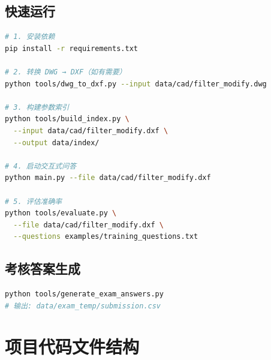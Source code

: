 \documentclass[11pt,a4paper]{article}
\begin{document}
\subsection{快速运行}

\begin{lstlisting}[frame=single,language=bash]
# 1. 安装依赖
pip install -r requirements.txt

# 2. 转换 DWG → DXF（如有需要）
python tools/dwg_to_dxf.py --input data/cad/filter_modify.dwg

# 3. 构建参数索引
python tools/build_index.py \
  --input data/cad/filter_modify.dxf \
  --output data/index/

# 4. 启动交互式问答
python main.py --file data/cad/filter_modify.dxf

# 5. 评估准确率
python tools/evaluate.py \
  --file data/cad/filter_modify.dxf \
  --questions examples/training_questions.txt
\end{lstlisting}

\subsection{考核答案生成}

\begin{lstlisting}[frame=single,language=bash]
python tools/generate_exam_answers.py
# 输出: data/exam_temp/submission.csv
\end{lstlisting}

\section{项目代码文件结构}
\end{document}
